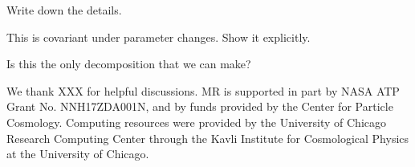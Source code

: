 \documentclass[aps,nofootinbib,notitlepage,superscriptaddress,twocolumn,10pt,prd]{revtex4-1}
\begin{document}
Write down the details.

This is covariant under parameter changes. Show it explicitly.

Is this the only decomposition that we can make?



%
\begin{acknowledgments}
%
We thank
XXX
for helpful discussions.
%
MR is supported in part by NASA ATP Grant No. NNH17ZDA001N, and by funds provided by the Center for Particle Cosmology.
%
Computing resources were provided by the University of Chicago Research Computing Center through the Kavli Institute for Cosmological Physics at the University of Chicago.
%
\end{acknowledgments}
%


%
\end{document}
